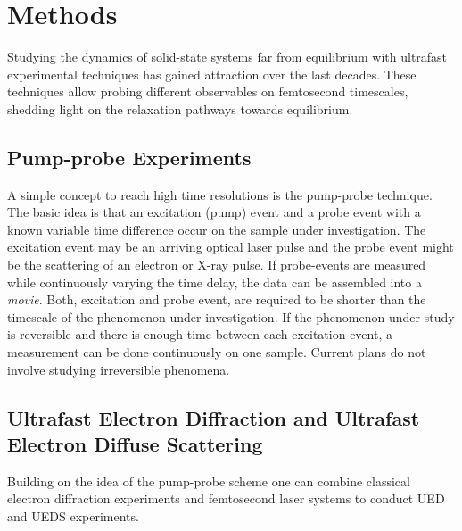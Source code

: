 \section{Methods}
Studying the dynamics of solid-state systems far from equilibrium with ultrafast experimental techniques has gained attraction over the last decades.
These techniques allow probing different observables on femtosecond timescales, shedding light on the relaxation pathways towards equilibrium.

\subsection{Pump-probe Experiments}
A simple concept to reach high time resolutions is the pump-probe technique.
The basic idea is that an excitation (pump) event and a probe event with a known variable time difference occur on the sample under investigation.
The excitation event may be an arriving optical laser pulse and the probe event might be the scattering of an electron or X-ray pulse.
If probe-events are measured while continuously varying the time delay, the data can be assembled into a \emph{movie}.
Both, excitation and probe event, are required to be shorter than the timescale of the phenomenon under investigation.
If the phenomenon under study is reversible and there is enough time between each excitation event, a measurement can be done continuously on one sample.
Current plans do not involve studying irreversible phenomena.

\subsection{Ultrafast Electron Diffraction and Ultrafast Electron Diffuse Scattering}
Building on the idea of the pump-probe scheme one can combine classical electron diffraction experiments and femtosecond laser systems to conduct \ac{UED} and \ac{UEDS} experiments.

